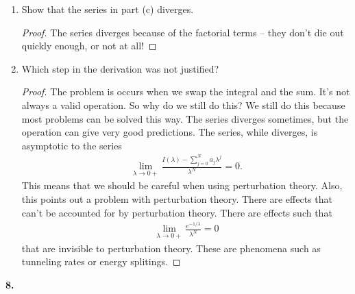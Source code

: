 \documentclass{book}
\theoremstyle{definition}
\newcommand{\f}[2]{\frac{#1}{#2}}
\begin{document}
\begin{enumerate}
	
	
	\item Show that the series in part (c) diverges.
	\begin{proof}
		The series diverges because of the factorial terms -- they don't die out quickly enough, or not at all! 
	\end{proof}
	
	
	\item Which step in the derivation was not justified?
	\begin{proof}
		The problem is occurs when we swap the integral and the sum. It's not always a valid operation. So why do we still do this? We still do this because most problems can be solved this way. The series diverges sometimes, but the operation can give very good predictions. The series, while diverges, is asymptotic to the series
		\begin{align}
		\lim_{\lambda \to 0+} \f{ I(\lambda) - \sum^N_{j=0}a_j \lambda^j}{\lambda^N} = 0.
		\end{align}
		This means that we should be careful when using perturbation theory. Also, this points out a problem with perturbation theory. There are effects that can't be accounted for by perturbation theory. There are effects such that
		\begin{align}
		\lim_{\lambda \to 0+} \f{e^{-1/\lambda}}{\lambda^N} = 0
		\end{align}
		that are invisible to perturbation theory. These are phenomena such as tunneling rates or energy splitings.
	\end{proof}
	
\end{enumerate}





\noindent \textbf{8.}







\newpage
\end{document}
